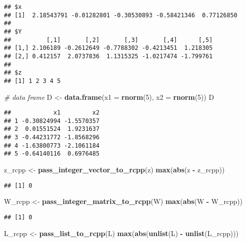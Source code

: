 \documentclass[
]{book}
\newenvironment{Shaded}{\begin{snugshade}}{\end{snugshade}}
\newcommand{\CommentTok}[1]{\textcolor[rgb]{0.56,0.35,0.01}{\textit{#1}}}
\newcommand{\DataTypeTok}[1]{\textcolor[rgb]{0.13,0.29,0.53}{#1}}
\newcommand{\DecValTok}[1]{\textcolor[rgb]{0.00,0.00,0.81}{#1}}
\newcommand{\KeywordTok}[1]{\textcolor[rgb]{0.13,0.29,0.53}{\textbf{#1}}}
\newcommand{\NormalTok}[1]{#1}
\newcommand{\OperatorTok}[1]{\textcolor[rgb]{0.81,0.36,0.00}{\textbf{#1}}}
\newcommand{\StringTok}[1]{\textcolor[rgb]{0.31,0.60,0.02}{#1}}
\begin{document}
\begin{verbatim}
## $x
## [1]  2.18543791 -0.01282801 -0.30530893 -0.58421346  0.77126850
## 
## $Y
##          [,1]       [,2]       [,3]       [,4]      [,5]
## [1,] 2.106189 -0.2612649 -0.7788302 -0.4213451  1.218305
## [2,] 0.412157  2.0737836  1.1315325 -1.0217474 -1.799761
## 
## $z
## [1] 1 2 3 4 5
\end{verbatim}

\begin{Shaded}
\begin{Highlighting}[]
\CommentTok{# data frame}
\NormalTok{D <-}\StringTok{ }\KeywordTok{data.frame}\NormalTok{(}\DataTypeTok{x1 =} \KeywordTok{rnorm}\NormalTok{(}\DecValTok{5}\NormalTok{), }\DataTypeTok{x2 =} \KeywordTok{rnorm}\NormalTok{(}\DecValTok{5}\NormalTok{))}
\NormalTok{D}
\end{Highlighting}
\end{Shaded}

\begin{verbatim}
##            x1         x2
## 1 -0.30824994 -1.5570357
## 2  0.01551524  1.9231637
## 3 -0.44231772 -1.8568296
## 4 -1.63800773 -2.1061184
## 5 -0.64140116  0.6976485
\end{verbatim}

\begin{Shaded}
\begin{Highlighting}[]
\NormalTok{z_rcpp <-}\StringTok{ }\KeywordTok{pass_integer_vector_to_rcpp}\NormalTok{(z)}
\KeywordTok{max}\NormalTok{(}\KeywordTok{abs}\NormalTok{(z }\OperatorTok{-}\StringTok{ }\NormalTok{z_rcpp))}
\end{Highlighting}
\end{Shaded}

\begin{verbatim}
## [1] 0
\end{verbatim}

\begin{Shaded}
\begin{Highlighting}[]
\NormalTok{W_rcpp <-}\StringTok{ }\KeywordTok{pass_integer_matrix_to_rcpp}\NormalTok{(W)}
\KeywordTok{max}\NormalTok{(}\KeywordTok{abs}\NormalTok{(W }\OperatorTok{-}\StringTok{ }\NormalTok{W_rcpp))}
\end{Highlighting}
\end{Shaded}

\begin{verbatim}
## [1] 0
\end{verbatim}

\begin{Shaded}
\begin{Highlighting}[]
\NormalTok{L_rcpp <-}\StringTok{ }\KeywordTok{pass_list_to_rcpp}\NormalTok{(L)}
\KeywordTok{max}\NormalTok{(}\KeywordTok{abs}\NormalTok{(}\KeywordTok{unlist}\NormalTok{(L) }\OperatorTok{-}\StringTok{ }\KeywordTok{unlist}\NormalTok{(L_rcpp)))}
\end{Highlighting}
\end{Shaded}
\end{document}
